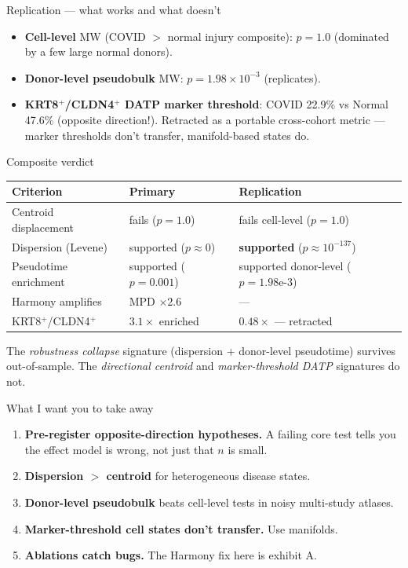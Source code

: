 \documentclass[aspectratio=169]{beamer}
\begin{document}
\begin{frame}{Replication --- what works and what doesn't}
\begin{itemize}
  \item \textbf{Cell-level} MW (COVID $>$ normal injury composite): $p = 1.0$
        (dominated by a few large normal donors).
  \item \textbf{Donor-level pseudobulk} MW: $p = 1.98\times 10^{-3}$
        \alert{(replicates)}.
  \item \textbf{KRT8$^+$/CLDN4$^+$ DATP marker threshold}:
        COVID 22.9\% vs Normal 47.6\% (opposite direction!). \alert{Retracted}
        as a portable cross-cohort metric --- marker thresholds don't transfer,
        manifold-based states do.
\end{itemize}
\end{frame}

\begin{frame}{Composite verdict}
\small
\begin{tabular}{lll}
\toprule
Criterion & Primary & Replication \\
\midrule
Centroid displacement & \alert{fails} ($p=1.0$) & \alert{fails cell-level} ($p=1.0$) \\
Dispersion (Levene)   & supported ($p\approx 0$) & \textbf{supported} ($p\approx 10^{-137}$) \\
Pseudotime enrichment & supported ($p=0.001$)    & supported donor-level ($p=1.98\text{e-}3$) \\
Harmony amplifies     & MPD $\times 2.6$         & --- \\
KRT8$^+$/CLDN4$^+$    & $3.1\times$ enriched     & \alert{$0.48\times$ --- retracted} \\
\bottomrule
\end{tabular}
\normalsize
\vspace{0.5em}
The \emph{robustness collapse} signature (dispersion + donor-level pseudotime)
survives out-of-sample. The \emph{directional centroid} and
\emph{marker-threshold DATP} signatures do not.
\end{frame}

\begin{frame}{What I want you to take away}
\begin{enumerate}
  \item \textbf{Pre-register opposite-direction hypotheses.} A failing core
        test tells you the effect model is wrong, not just that $n$ is small.
  \item \textbf{Dispersion $>$ centroid} for heterogeneous disease states.
  \item \textbf{Donor-level pseudobulk} beats cell-level tests in noisy
        multi-study atlases.
  \item \textbf{Marker-threshold cell states don't transfer.} Use manifolds.
  \item \textbf{Ablations catch bugs.} The Harmony fix here is exhibit A.
\end{enumerate}
\end{frame}
\end{document}
